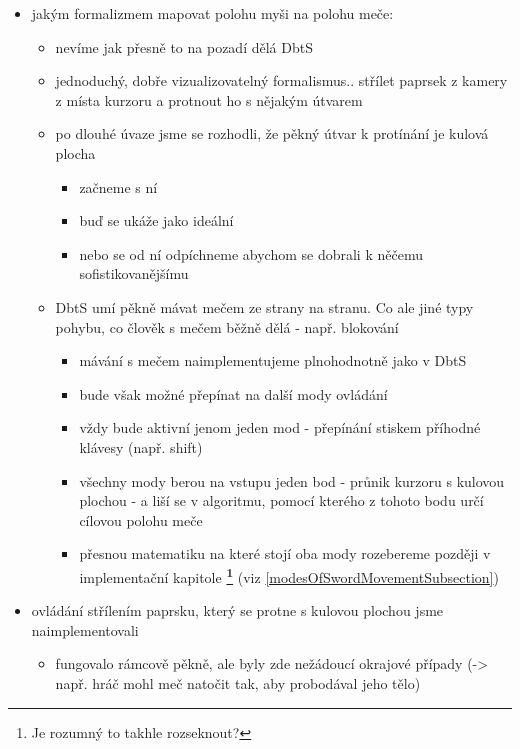\begin{itemize}
\begin{itemize}
        \end{itemize}
    \item jakým formalizmem mapovat polohu myši na polohu meče:
        \begin{itemize}
            \item nevíme jak přesně to na pozadí dělá DbtS
            \item jednoduchý, dobře vizualizovatelný formalismus.. střílet paprsek z kamery z místa kurzoru a protnout ho s nějakým útvarem 
            \item po dlouhé úvaze jsme se rozhodli, že pěkný útvar k protínání je kulová plocha
                \begin{itemize}
                    \item začneme s ní
                    \item buď se ukáže jako ideální
                    \item nebo se od ní odpíchneme abychom se dobrali k něčemu sofistikovanějšímu
                \end{itemize}
            \item DbtS umí pěkně mávat mečem ze strany na stranu. Co ale jiné typy pohybu, co člověk s mečem běžně dělá - např. blokování
                \begin{itemize}
                    \item mávání s mečem naimplementujeme plnohodnotně jako v DbtS 
                    \item bude však možné přepínat na další mody ovládání
                    \item vždy bude aktivní jenom jeden mod - přepínání stiskem příhodné klávesy (např. shift)
                    \item všechny mody berou na vstupu jeden bod - průnik kurzoru s kulovou plochou - a liší se v algoritmu, pomocí kterého z tohoto bodu určí cílovou polohu meče
                    \item přesnou matematiku na které stojí oba mody rozebereme později v implementační kapitole \textbf{\footnote{Je rozumný to takhle rozseknout?}} (viz \ref{modesOfSwordMovementSubsection})
                \end{itemize}
        \end{itemize}
    \item ovládání střílením paprsku, který se protne s kulovou plochou jsme naimplementovali
        \begin{itemize}
            \item fungovalo rámcově pěkně, ale byly zde nežádoucí okrajové případy (-> např. hráč mohl meč natočit tak, aby probodával jeho tělo)

\end{itemize}
\end{itemize}
